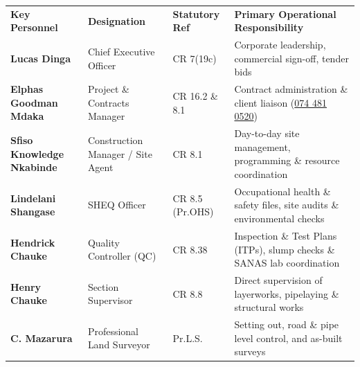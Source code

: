 \documentclass[a4paper,11pt]{article}
\begin{document}
\noindent
\renewcommand{\arraystretch}{1.16}
\begin{tabularx}{\textwidth}{@{}p{3.8cm} p{3.5cm} p{2.2cm} X@{}}
\rowcolor{mhnavy}
{\color{white}\bfseries\fontsize{7.9pt}{9.6pt}\selectfont Key Personnel} &
{\color{white}\bfseries\fontsize{7.9pt}{9.6pt}\selectfont Designation} &
{\color{white}\bfseries\fontsize{7.9pt}{9.6pt}\selectfont Statutory Ref} &
{\color{white}\bfseries\fontsize{7.9pt}{9.6pt}\selectfont Primary Operational Responsibility} \\
\rowcolor{mhbluelight}
\fontsize{7.5pt}{9.3pt}\selectfont\bfseries Lucas Dinga & \fontsize{7.5pt}{9.3pt}\selectfont Chief Executive Officer & \fontsize{7.5pt}{9.3pt}\selectfont CR 7(19c) & \fontsize{7.5pt}{9.3pt}\selectfont Corporate leadership, commercial sign-off, tender bids \\
\fontsize{7.5pt}{9.3pt}\selectfont\bfseries Elphas Goodman Mdaka & \fontsize{7.5pt}{9.3pt}\selectfont Project \& Contracts Manager & \fontsize{7.5pt}{9.3pt}\selectfont CR 16.2 \& 8.1 & \fontsize{7.5pt}{9.3pt}\selectfont Contract administration \& client liaison (\href{tel:0744810520}{074 481 0520}) \\
\rowcolor{mhbluelight}
\fontsize{7.5pt}{9.3pt}\selectfont\bfseries Sfiso Knowledge Nkabinde & \fontsize{7.5pt}{9.3pt}\selectfont Construction Manager / Site Agent & \fontsize{7.5pt}{9.3pt}\selectfont CR 8.1 & \fontsize{7.5pt}{9.3pt}\selectfont Day-to-day site management, programming \& resource coordination \\
\fontsize{7.5pt}{9.3pt}\selectfont\bfseries Lindelani Shangase & \fontsize{7.5pt}{9.3pt}\selectfont SHEQ Officer & \fontsize{7.5pt}{9.3pt}\selectfont CR 8.5 (Pr.OHS) & \fontsize{7.5pt}{9.3pt}\selectfont Occupational health \& safety files, site audits \& environmental checks \\
\rowcolor{mhbluelight}
\fontsize{7.5pt}{9.3pt}\selectfont\bfseries Hendrick Chauke & \fontsize{7.5pt}{9.3pt}\selectfont Quality Controller (QC) & \fontsize{7.5pt}{9.3pt}\selectfont CR 8.38 & \fontsize{7.5pt}{9.3pt}\selectfont Inspection \& Test Plans (ITPs), slump checks \& SANAS lab coordination \\
\fontsize{7.5pt}{9.3pt}\selectfont\bfseries Henry Chauke & \fontsize{7.5pt}{9.3pt}\selectfont Section Supervisor & \fontsize{7.5pt}{9.3pt}\selectfont CR 8.8 & \fontsize{7.5pt}{9.3pt}\selectfont Direct supervision of layerworks, pipelaying \& structural works \\
\rowcolor{mhbluelight}
\fontsize{7.5pt}{9.3pt}\selectfont\bfseries C. Mazarura & \fontsize{7.5pt}{9.3pt}\selectfont Professional Land Surveyor & \fontsize{7.5pt}{9.3pt}\selectfont Pr.L.S. & \fontsize{7.5pt}{9.3pt}\selectfont Setting out, road \& pipe level control, and as-built surveys \\
\end{tabularx}
\renewcommand{\arraystretch}{1}
\end{document}
